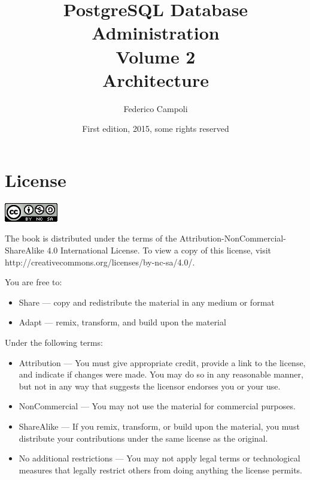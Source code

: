 \documentclass[twoside]{book}
\author{Federico Campoli}
\title{PostgreSQL Database Administration \\ Volume 2 \\ Architecture}
\date{First edition, 2015, some rights reserved}
\begin{document}

\maketitle



\chapter*{License}
\begin{center}
 \includegraphics{images/cc_logo.png}
\end{center}

The book is distributed under the terms of the Attribution-NonCommercial-ShareAlike 4.0 International 
License. To view a copy of this license, visit http://creativecommons.org/licenses/by-nc-sa/4.0/.\newline


You are free to:
\begin{itemize}
 
\item     Share — copy and redistribute the material in any medium or format
\item     Adapt — remix, transform, and build upon the material

\end{itemize}


Under the following terms:
\begin{itemize}
\item    Attribution — You must give appropriate credit, provide a link to the license, and indicate if 
changes were made. You may do so in any reasonable manner, but not in any way that suggests the licensor 
endorses you or your use.

\item    NonCommercial — You may not use the material for commercial purposes.

\item    ShareAlike — If you remix, transform, or build upon the material, you must distribute your 
contributions under the same license as the original.

\item    No additional restrictions — You may not apply legal terms or technological measures that legally 
restrict others from doing anything the license permits.

\end{itemize}
\end{document}

